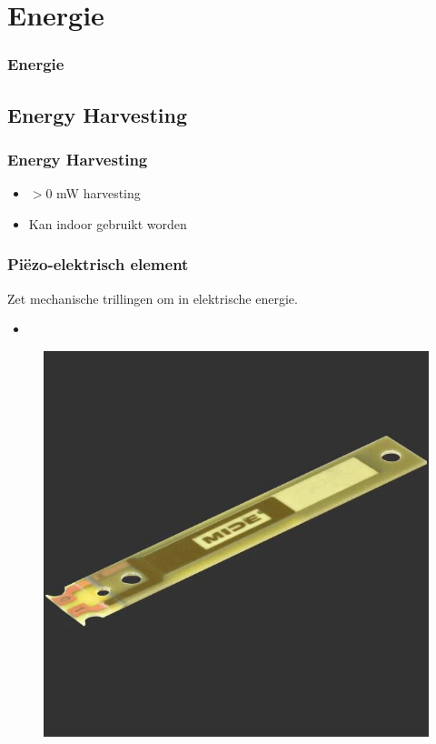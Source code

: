 \section{Energie}
\begin{frame}
    \frametitle{Energie}
\end{frame}
    \subsection{Energy Harvesting}
    \begin{frame}
        \frametitle{Energy Harvesting}
        \begin{itemize}
            \item $>$0 mW harvesting
            \item Kan indoor gebruikt worden
        \end{itemize}

    \end{frame}


    \begin{frame}
        \frametitle{Piëzo-elektrisch element}
    
        Zet mechanische trillingen om in elektrische energie.
        \begin{itemize}
            \item 
        \end{itemize}
        \begin{figure}[h]
            \raggedleft
            \includegraphics[scale=0.15]{img/peizo.png}
        \end{figure}
        

    
    \end{frame}

